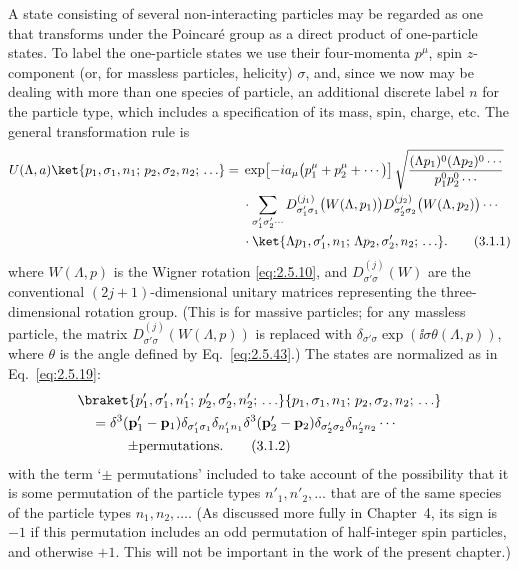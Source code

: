 A state consisting of several non-interacting particles may be regarded as
one that transforms under the Poincar\'e group as a
direct product of one-particle states. To label the one-particle states we use
their four-momenta $p^\mu$, spin $z$-component (or, for massless particles,
helicity) $\sigma$, and, since we now may be dealing with more than one
species of particle, an additional discrete label $n$ for the particle type,
which includes a specification of its mass, spin, charge, etc. The general
transformation rule is
\begin{align}
U(\Lambda,a)\ket{p_1,\sigma_1,n_1;\,p_2,\sigma_2,n_2;\,\ldots}
={}&\exp\!\left[-ia_\mu\bigl(p_1^\mu+p_2^\mu+\cdots\bigr)\right]
\sqrt{\frac{(\Lambda p_1)^0(\Lambda p_2)^0\cdots}{p_1^0p_2^0\cdots}}
\notag\\
&\cdot\sum_{\sigma'_1\sigma'_2\cdots}
D^{(j_1)}_{\sigma'_1\sigma_1}\bigl(W(\Lambda,p_1)\bigr)
D^{(j_2)}_{\sigma'_2\sigma_2}\bigl(W(\Lambda,p_2)\bigr)\cdots
\notag\\
&\cdot\ket{\Lambda p_1,\sigma'_1,n_1;\,
             \Lambda p_2,\sigma'_2,n_2;\,\ldots}.
\tag{3.1.1}\label{eq:3.1.1}
\end{align}
where $W(\Lambda,p)$ is the Wigner rotation \eqref{eq:2.5.10}, and
$D^{(j)}_{\sigma'\sigma}(W)$ are the conventional $(2j+1)$-dimensional
unitary matrices representing the three-dimensional rotation group. (This is
for massive particles; for any massless particle, the matrix
$D^{(j)}_{\sigma'\sigma}(W(\Lambda,p))$ is replaced with
$\delta_{\sigma'\sigma}\exp(\ii\sigma\theta(\Lambda,p))$, where $\theta$ is
the angle defined by Eq.~\eqref{eq:2.5.43}.) The states are normalized as in
Eq.~\eqref{eq:2.5.19}:
\begin{align}
&\braket{p'_1,\sigma'_1,n'_1;\,p'_2,\sigma'_2,n'_2;\,\ldots}
 {p_1,\sigma_1,n_1;\,p_2,\sigma_2,n_2;\,\ldots}
\notag\\
&\quad={}
\delta^3(\mathbf p'_1-\mathbf p_1)\delta_{\sigma'_1\sigma_1}
\delta_{n'_1n_1}
\delta^3(\mathbf p'_2-\mathbf p_2)\delta_{\sigma'_2\sigma_2}
\delta_{n'_2n_2}\cdots
\notag\\
&\qquad\mathrel{\phantom{={}}}\pm\text{permutations}.
\tag{3.1.2}\label{eq:3.1.2}
\end{align}
with the term `$\pm$ permutations' included to take account of the
possibility that it is some permutation of the particle types
$n'_1,n'_2,\ldots$ that are of the same species of the particle types
$n_1,n_2,\ldots$. (As discussed more fully in Chapter~4, its sign is $-1$
if this permutation includes an odd permutation of half-integer spin
particles, and otherwise $+1$. This will not be important in the work of the
present chapter.)

